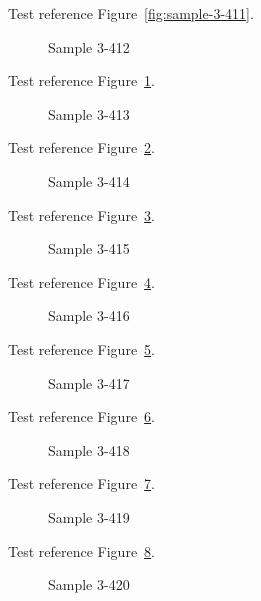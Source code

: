 Test reference Figure~\ref{fig:sample-3-411}.

\begin{figure}[tbhp]
\caption{Sample 3-412}
\label{fig:sample-3-412}
\end{figure}

Test reference Figure~\ref{fig:sample-3-412}.

\begin{figure}[tbhp]
\caption{Sample 3-413}
\label{fig:sample-3-413}
\end{figure}

Test reference Figure~\ref{fig:sample-3-413}.

\begin{figure}[tbhp]
\caption{Sample 3-414}
\label{fig:sample-3-414}
\end{figure}

Test reference Figure~\ref{fig:sample-3-414}.

\begin{figure}[tbhp]
\caption{Sample 3-415}
\label{fig:sample-3-415}
\end{figure}

Test reference Figure~\ref{fig:sample-3-415}.

\begin{figure}[tbhp]
\caption{Sample 3-416}
\label{fig:sample-3-416}
\end{figure}

Test reference Figure~\ref{fig:sample-3-416}.

\begin{figure}[tbhp]
\caption{Sample 3-417}
\label{fig:sample-3-417}
\end{figure}

Test reference Figure~\ref{fig:sample-3-417}.

\begin{figure}[tbhp]
\caption{Sample 3-418}
\label{fig:sample-3-418}
\end{figure}

Test reference Figure~\ref{fig:sample-3-418}.

\begin{figure}[tbhp]
\caption{Sample 3-419}
\label{fig:sample-3-419}
\end{figure}

Test reference Figure~\ref{fig:sample-3-419}.

\begin{figure}[tbhp]
\caption{Sample 3-420}
\label{fig:sample-3-420}
\end{figure}

